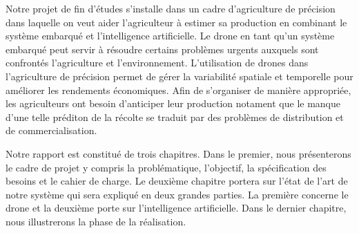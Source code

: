 Notre projet de fin d'études s'installe dans un cadre d'agriculture de précision dans laquelle on veut aider l'agriculteur à estimer sa production en combinant le système embarqué et l'intelligence artificielle. Le drone en tant qu'un système embarqué peut servir à résoudre certains problèmes urgents auxquels sont confrontés l'agriculture et l'environnement. L'utilisation de drones dans l'agriculture de précision permet de gérer la variabilité spatiale et temporelle pour améliorer les rendements économiques. Afin de s'organiser de manière appropriée, les agriculteurs ont besoin d'anticiper leur production notament que le manque d'une telle préditon de la récolte se traduit par des problèmes de distribution et de commercialisation.

Notre rapport est constitué de trois chapitres. Dans le premier, nous présenterons le cadre de projet y compris la problématique, l'objectif, la spécification des besoins et le cahier de charge. Le deuxième chapitre portera sur l'état de l'art de notre système qui sera expliqué en deux grandes parties. La première concerne le drone et la deuxième porte sur l'intelligence artificielle. Dans le dernier chapitre, nous illustrerons la phase de la réalisation.